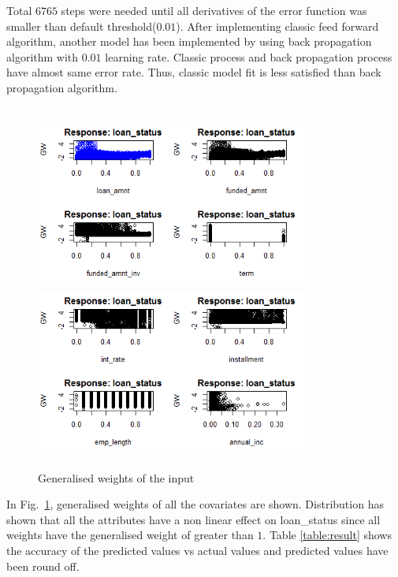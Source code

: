\documentclass{article}[]
\begin{document}
Total $6765$ steps were needed until all derivatives of the error function  was smaller than default threshold($0.01$). After implementing classic feed forward algorithm, another model has been implemented by using back propagation algorithm with $0.01$ learning rate. Classic process and back propagation process have almost same error rate. Thus, classic model fit is less satisfied than back propagation algorithm.\\\\
\begin{figure}[!htb]
\centering
\includegraphics[width=0.8\textwidth]{image3.png}
\includegraphics[width=0.8\textwidth]{image4.png}
\caption{Generalised weights of the input}
\label{fig:gw}
\end{figure}
In Fig.~\ref{fig:gw}, generalised weights of all the covariates are shown. Distribution has shown that all the attributes have a non linear effect on loan\_status since all weights have the generalised weight of greater than $1$. Table \ref{table:result} shows the accuracy of the predicted values vs actual values and predicted values have been round off.\\\\
\end{document}
